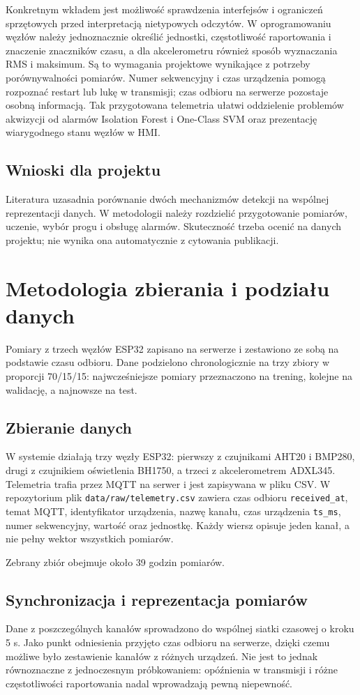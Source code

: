 \documentclass[12pt,a4paper]{article}
\begin{document}
Konkretnym wkładem jest możliwość sprawdzenia interfejsów i ograniczeń
sprzętowych przed interpretacją nietypowych odczytów. W oprogramowaniu
węzłów należy jednoznacznie określić jednostki, częstotliwość raportowania
i znaczenie znaczników czasu, a dla akcelerometru również sposób
wyznaczania RMS i maksimum. Są to wymagania projektowe wynikające
z potrzeby porównywalności pomiarów. Numer sekwencyjny i czas urządzenia
pomogą rozpoznać restart lub lukę w transmisji; czas odbioru na serwerze
pozostaje osobną informacją. Tak przygotowana telemetria ułatwi
oddzielenie problemów akwizycji od alarmów Isolation Forest i One-Class SVM
oraz prezentację wiarygodnego stanu węzłów w HMI.

\subsection{Wnioski dla projektu}
Literatura uzasadnia porównanie dwóch mechanizmów detekcji na wspólnej
reprezentacji danych. W metodologii należy rozdzielić przygotowanie pomiarów,
uczenie, wybór progu i obsługę alarmów. Skuteczność trzeba ocenić na danych
projektu; nie wynika ona automatycznie z cytowania publikacji.

\section{Metodologia zbierania i podziału danych}
Pomiary z trzech węzłów ESP32 zapisano na serwerze i zestawiono ze sobą na podstawie czasu odbioru. Dane podzielono chronologicznie na trzy zbiory w proporcji 70/15/15: najwcześniejsze pomiary przeznaczono na trening, kolejne na walidację, a najnowsze na test.

\subsection{Zbieranie danych}
W systemie działają trzy węzły ESP32: pierwszy z czujnikami AHT20 i BMP280, drugi z czujnikiem oświetlenia BH1750, a trzeci z akcelerometrem ADXL345. Telemetria trafia przez MQTT na serwer i jest zapisywana w pliku CSV. W repozytorium plik \texttt{data/raw/telemetry.csv} zawiera czas odbioru \texttt{received\_at}, temat MQTT, identyfikator urządzenia, nazwę kanału, czas urządzenia \texttt{ts\_ms}, numer sekwencyjny, wartość oraz jednostkę. Każdy wiersz opisuje jeden kanał, a nie pełny wektor wszystkich pomiarów.

Zebrany zbiór obejmuje około 39 godzin pomiarów.

\subsection{Synchronizacja i reprezentacja pomiarów}
Dane z poszczególnych kanałów sprowadzono do wspólnej siatki czasowej o kroku 5 s. Jako punkt odniesienia przyjęto czas odbioru na serwerze, dzięki czemu możliwe było zestawienie kanałów z różnych urządzeń. Nie jest to jednak równoznaczne z jednoczesnym próbkowaniem: opóźnienia w transmisji i różne częstotliwości raportowania nadal wprowadzają pewną niepewność.
\end{document}
